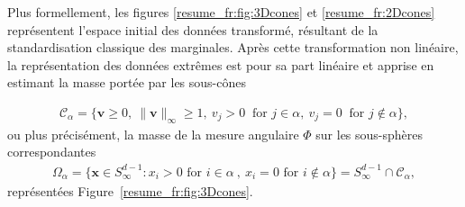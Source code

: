 \documentclass[a4paper, 12pt]{article}
\def\mb{\mathbf}
\begin{document}
Plus formellement, les figures \ref{resume_fr:fig:3Dcones} et \ref{resume_fr:2Dcones} représentent l'espace initial des données transformé, résultant de la standardisation classique des marginales. Après cette transformation non linéaire, la représentation des données extrêmes est pour sa part linéaire et apprise en estimant la masse portée par les sous-cônes

\begin{align*}
 \mathcal{C}_\alpha = \{\mb v \ge 0,~\|\mb v\|_\infty \ge 1,~ v_j > 0 ~\text{ for } j \in \alpha,~ v_j = 0 ~\text{ for } j \notin \alpha \},
\end{align*}
ou plus précisément, la masse de la mesure angulaire $\Phi$ sur les sous-sphères correspondantes
\begin{align*}
\Omega_{\alpha}  = \{\mb x \in S_{\infty}^{d-1} :  x_i > 0 \text{ for } i\in\alpha~,~  x_i = 0 \text{ for } i\notin \alpha   \} 
 = S_{\infty}^{d-1}\cap {\mathcal{C}}_\alpha,
\end{align*}
représentées Figure~\ref{resume_fr:fig:3Dcones}.
\end{document}

